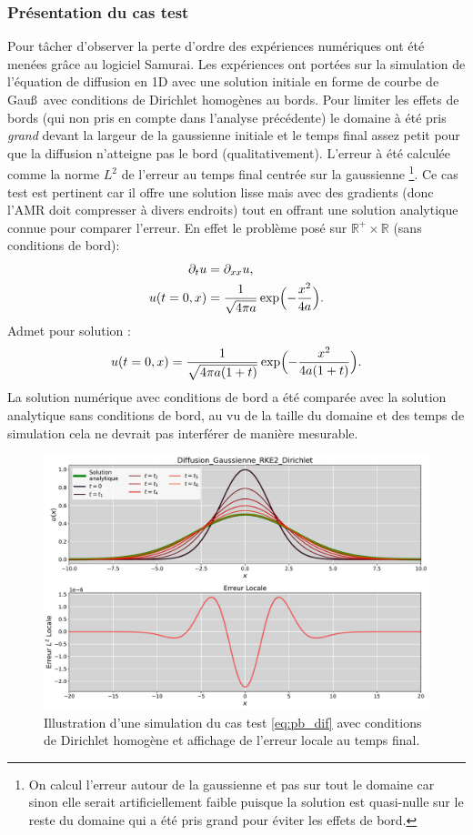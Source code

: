 \subsubsection{Présentation du cas test}
    Pour tâcher d'observer la perte d'ordre des expériences numériques ont été menées grâce au logiciel Samurai.
    Les expériences ont portées sur la simulation de l'équation de diffusion en 1D avec une solution initiale 
    en forme de courbe de Gau\ss\, avec conditions de Dirichlet homogènes au bords. 
    Pour limiter les effets de bords (qui non pris en compte dans l'analyse précédente) le domaine à été pris \textit{grand}
    devant la largeur de la gaussienne initiale et le temps final assez petit pour que la diffusion n'atteigne pas le bord (qualitativement).
    L'erreur à été calculée comme la norme $L^2$ de l'erreur au temps final centrée sur la gaussienne
    \footnote{On calcul l'erreur autour de la gaussienne et pas sur tout le domaine car sinon elle serait artificiellement faible puisque la solution est quasi-nulle sur le reste du domaine qui a été pris grand pour éviter les effets de bord.}.
    Ce cas test est pertinent car il offre une solution lisse mais avec des gradients (donc l'AMR doit compresser à divers endroits)
    tout en offrant une solution analytique connue pour comparer l'erreur. 
    En effet le problème posé sur $\mathbb R^+ \times \mathbb R$ (sans conditions de bord): 
    \begin{align}
        \partial_t u &= \partial_{xx} u,\label{eq:pb_dif}\\\notag
        u(t=0,x) &= \frac{1}{\sqrt{4 \pi a }} \exp\Bigl( - \frac{x^2}{4a}\Bigr).
    \end{align}
    Admet pour solution :
    \begin{align}
        u(t=0,x) = \frac{1}{\sqrt{4 \pi a (1+t)}} \exp\Bigl(-\frac{x^2}{4a(1+t)}\Bigr).
    \end{align}
    La solution numérique avec conditions de bord a été comparée avec la solution analytique sans conditions de bord, 
    au vu de la taille du domaine et des temps de simulation cela ne devrait pas interférer de manière mesurable.

    \begin{figure}[htbp]
        \centering
        \includegraphics[width=.8\textwidth]{media/4_travail/1_AMR/illustration/Diffusion_Gaussienne_RKE2_Dirichlet.pdf}
        \caption{Illustration d'une simulation du cas test \ref{eq:pb_dif} avec conditions de Dirichlet homogène et
        affichage de l'erreur locale au temps final.}
        \label{fig:diffusion_gaussienne}
    \end{figure}
